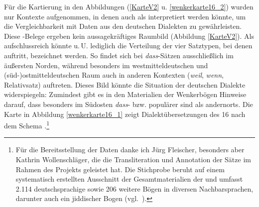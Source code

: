 Für die Kartierung in den Abbildungen (\ref{KarteV2} u. \ref{wenkerkarte16_2}) wurden nur Kontexte aufgenommen, in denen  auch als \hai{{\VPR}} interpretiert werden könnte, um die Vergleichbarkeit mit Daten aus den deutschen Dialekten zu gewährleisten. Diese -Belege ergeben kein aussagekräftiges Raumbild (Abbildung \ref{KarteV2}). Als aufschlussreich könnte u.\,U. lediglich die Verteilung der vier Satztypen, bei denen  auftritt, bezeichnet werden. So findet sich  bei \textit{dass}-Sätzen ausschließlich im äußersten Norden, während besonders im 
westmitteldeutschen %
und (süd-)ost\-mittel\-deut\-schen Raum  auch in anderen Kontexten (\textit{weil}, \textit{wenn}, Relativsatz) auftreten. Dieses Bild könnte die Situation der deutschen Dialekte widerspiegeln: Zumindest gibt es in den Materialien der Wenkerbögen Hinweise darauf, dass besonders im Südosten \textit{dass}- bzw. \hai{{\VPR}} populärer sind als andernorts. \label{WS16}Die Karte in Abbildung \ref{wenkerkarte16_1} zeigt Dialektübersetzungen des  16  nach dem Schema .\footnote{Für die Bereitsstellung der Daten danke ich Jürg Fleischer, besonders aber Kathrin Wollenschläger, die die Transliteration und Annotation der Sätze im Rahmen des Projekts  geleistet hat. Die Stichprobe beruht auf einem systematisch erstellten Ausschnitt der Gesamtmaterialien der  und umfasst 2.114 deutschsprachige  sowie 206 weitere Bögen in diversen Nachbarsprachen, darunter auch ein jiddischer Bogen (vgl.\, \citealt{Fleischer2011,FleischerSchaeferErsch}). %
}
